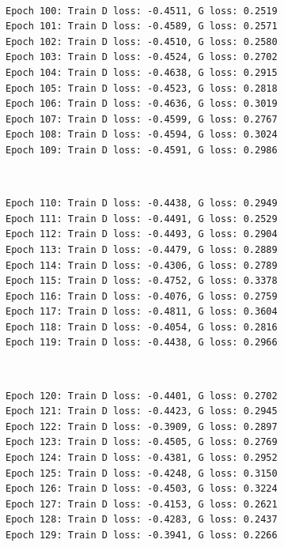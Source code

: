 \documentclass[11pt]{article}
\begin{document}
    \begin{center}
    \end{center}
    { \hspace*{\fill} \\}
    
    \begin{Verbatim}[commandchars=\\\{\}]
Epoch 100: Train D loss: -0.4511, G loss: 0.2519
Epoch 101: Train D loss: -0.4589, G loss: 0.2571
Epoch 102: Train D loss: -0.4510, G loss: 0.2580
Epoch 103: Train D loss: -0.4524, G loss: 0.2702
Epoch 104: Train D loss: -0.4638, G loss: 0.2915
Epoch 105: Train D loss: -0.4523, G loss: 0.2818
Epoch 106: Train D loss: -0.4636, G loss: 0.3019
Epoch 107: Train D loss: -0.4599, G loss: 0.2767
Epoch 108: Train D loss: -0.4594, G loss: 0.3024
Epoch 109: Train D loss: -0.4591, G loss: 0.2986

    \end{Verbatim}

    \begin{center}
    \end{center}
    { \hspace*{\fill} \\}
    
    \begin{Verbatim}[commandchars=\\\{\}]
Epoch 110: Train D loss: -0.4438, G loss: 0.2949
Epoch 111: Train D loss: -0.4491, G loss: 0.2529
Epoch 112: Train D loss: -0.4493, G loss: 0.2904
Epoch 113: Train D loss: -0.4479, G loss: 0.2889
Epoch 114: Train D loss: -0.4306, G loss: 0.2789
Epoch 115: Train D loss: -0.4752, G loss: 0.3378
Epoch 116: Train D loss: -0.4076, G loss: 0.2759
Epoch 117: Train D loss: -0.4811, G loss: 0.3604
Epoch 118: Train D loss: -0.4054, G loss: 0.2816
Epoch 119: Train D loss: -0.4438, G loss: 0.2966

    \end{Verbatim}

    \begin{center}
    \end{center}
    { \hspace*{\fill} \\}
    
    \begin{Verbatim}[commandchars=\\\{\}]
Epoch 120: Train D loss: -0.4401, G loss: 0.2702
Epoch 121: Train D loss: -0.4423, G loss: 0.2945
Epoch 122: Train D loss: -0.3909, G loss: 0.2897
Epoch 123: Train D loss: -0.4505, G loss: 0.2769
Epoch 124: Train D loss: -0.4381, G loss: 0.2952
Epoch 125: Train D loss: -0.4248, G loss: 0.3150
Epoch 126: Train D loss: -0.4503, G loss: 0.3224
Epoch 127: Train D loss: -0.4153, G loss: 0.2621
Epoch 128: Train D loss: -0.4283, G loss: 0.2437
Epoch 129: Train D loss: -0.3941, G loss: 0.2266

    \end{Verbatim}
\end{document}
